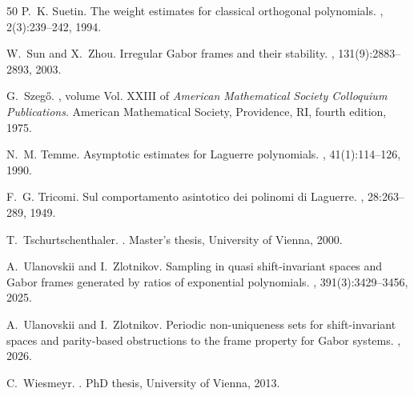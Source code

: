 \documentclass[11pt]{amsart}
\numberwithin{equation}{section}
\begin{document}
\begin{thebibliography}{50}
P.~K. Suetin.
\newblock The weight estimates for classical orthogonal polynomials.
, 2(3):239--242, 1994.

W.~Sun and X.~Zhou.
\newblock Irregular {G}abor frames and their stability.
, 131(9):2883--2893, 2003.

G.~Szegő.
, volume Vol. XXIII of {\em American Mathematical Society Colloquium Publications}.
\newblock American Mathematical Society, Providence, RI, fourth edition, 1975.

N.~M. Temme.
\newblock Asymptotic estimates for {L}aguerre polynomials.
, 41(1):114--126, 1990.

F.~G. Tricomi.
\newblock Sul comportamento asintotico dei polinomi di {L}aguerre.
, 28:263--289, 1949.

T.~Tschurtschenthaler.
.
\newblock Master's thesis, {University of Vienna}, 2000.

A.~Ulanovskii and I.~Zlotnikov.
\newblock Sampling in quasi shift-invariant spaces and {G}abor frames generated by ratios of exponential polynomials.
, 391(3):3429--3456, 2025.

A.~Ulanovskii and I.~Zlotnikov.
\newblock Periodic non-uniqueness sets for shift-invariant spaces and parity-based obstructions to the frame property for {G}abor systems.
, 2026.

C.~Wiesmeyr.
.
\newblock PhD thesis, University of Vienna, 2013.

\end{thebibliography}
\end{document}
